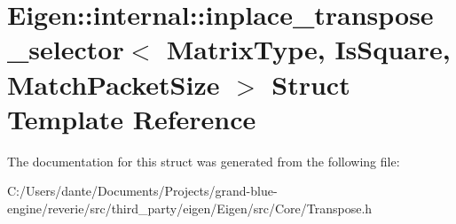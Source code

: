 \hypertarget{struct_eigen_1_1internal_1_1inplace__transpose__selector}{}\section{Eigen\+::internal\+::inplace\+\_\+transpose\+\_\+selector$<$ Matrix\+Type, Is\+Square, Match\+Packet\+Size $>$ Struct Template Reference}
\label{struct_eigen_1_1internal_1_1inplace__transpose__selector}


The documentation for this struct was generated from the following file\+:\begin{DoxyCompactItemize}
\item 
C\+:/\+Users/dante/\+Documents/\+Projects/grand-\/blue-\/engine/reverie/src/third\+\_\+party/eigen/\+Eigen/src/\+Core/Transpose.\+h\end{DoxyCompactItemize}

